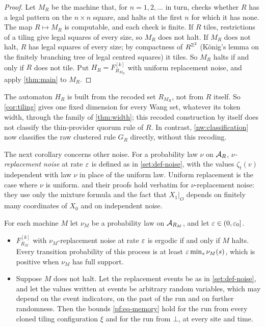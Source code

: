 \begin{proof}
Let $M_R$ be the machine that, for $n=1,2,\dots$ in turn, checks whether $R$ has a legal pattern on the $n\times n$ square, and halts at the first $n$ for which it has none. The map $R\mapsto M_R$ is computable, and each check is finite. If $R$ tiles, restrictions of a tiling give legal squares of every size, so $M_R$ does not halt. If $M_R$ does not halt, $R$ has legal squares of every size; by compactness of $R^{\mathbb{Z}^2}$ (König's lemma on the finitely branching tree of legal centred squares) it tiles. So $M_R$ halts if and only if $R$ does not tile. Put $H_R=F^{[k]}_{R_{M_R}}$ with uniform replacement noise, and apply \cref{thm:main} to $M_R$.
\end{proof}

The automaton $H_R$ is built from the recoded set $R_{M_R}$, not from $R$ itself. So \cref{cor:tiling} gives one fixed dimension for every Wang set, whatever its token width, through the family of \cref{thm:width}; this recoded construction by itself does not classify the thin-provider quorum rule of $R$. In contrast, \cref{nw:classification} now classifies the raw clustered rule $G_R$ directly, without this recoding.

The next corollary concerns other noise. For a probability law $\nu$ on $\mathcal{A}_R$, \emph{$\nu$-replacement noise} at rate $\varepsilon$ is defined as in \cref{set:def-noise}, with the values $\zeta_t(v)$ independent with law $\nu$ in place of the uniform law. Uniform replacement is the case where $\nu$ is uniform.  and their proofs hold verbatim for $\nu$-replacement noise: they use only the mixture formula and the fact that $X_1|_O$ depends on finitely many coordinates of $X_0$ and on independent noise.

\begin{corollary}\label{cor:laws}
For each machine $M$ let $\nu_M$ be a probability law on $\mathcal{A}_{R_M}$, and let $\varepsilon\in(0,\varepsilon_0]$.
\begin{itemize}
\item[(i)] $F^{[k]}_{R_M}$ with $\nu_M$-replacement noise at rate $\varepsilon$ is ergodic if and only if $M$ halts. Every transition probability of this process is at least $\varepsilon\min_s\nu_M(s)$, which is positive when $\nu_M$ has full support.
\item[(ii)] Suppose $M$ does not halt. Let the replacement events be as in \cref{set:def-noise}, and let the values written at events be arbitrary random variables, which may depend on the event indicators, on the past of the run and on further randomness. Then the bounds \eqref{pf:eq-memory} hold for the run from every cloned tiling configuration $\xi$ and for the run from $\bot$, at every site and time.
\end{itemize}
\end{corollary}

